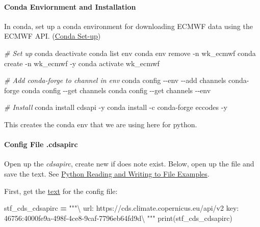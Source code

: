 \documentclass[
]{book}
\newenvironment{Shaded}{\begin{snugshade}}{\end{snugshade}}
\newcommand{\BuiltInTok}[1]{#1}
\newcommand{\CommentTok}[1]{\textcolor[rgb]{0.56,0.35,0.01}{\textit{#1}}}
\newcommand{\ExtensionTok}[1]{#1}
\newcommand{\NormalTok}[1]{#1}
\newcommand{\OperatorTok}[1]{\textcolor[rgb]{0.81,0.36,0.00}{\textbf{#1}}}
\newcommand{\StringTok}[1]{\textcolor[rgb]{0.31,0.60,0.02}{#1}}
\begin{document}
\hypertarget{conda-enviornment-and-installation}{%
\paragraph{Conda Enviornment and Installation}\label{conda-enviornment-and-installation}}

In conda, set up a conda environment for downloading ECMWF data using the ECMWF API. (\href{https://fanwangecon.github.io/Tex4Econ/nontex/install/windows/fn_installations.html}{Conda Set-up})

\begin{Shaded}
\begin{Highlighting}[]
\CommentTok{\# Set up}
\ExtensionTok{conda}\NormalTok{ deactivate}
\ExtensionTok{conda}\NormalTok{ list env}
\ExtensionTok{conda}\NormalTok{ env remove {-}n wk\_ecmwf}
\ExtensionTok{conda}\NormalTok{ create {-}n wk\_ecmwf {-}y}
\ExtensionTok{conda}\NormalTok{ activate wk\_ecmwf}

\CommentTok{\# Add conda{-}forge to channel in env}
\ExtensionTok{conda}\NormalTok{ config {-}{-}env {-}{-}add channels conda{-}forge}
\ExtensionTok{conda}\NormalTok{ config {-}{-}get channels}
\ExtensionTok{conda}\NormalTok{ config {-}{-}get channels {-}{-}env}

\CommentTok{\# Install}
\ExtensionTok{conda}\NormalTok{ install cdsapi {-}y}
\ExtensionTok{conda}\NormalTok{ install {-}c conda{-}forge eccodes {-}y}
\end{Highlighting}
\end{Shaded}

This creates the conda env that we are using here for python.

\hypertarget{config-file-.cdsapirc}{%
\paragraph{Config File .cdsapirc}\label{config-file-.cdsapirc}}

Open up the \emph{cdsapirc}, create new if does note exist. Below, open up the file and save the text. See \href{https://fanwangecon.github.io/pyfan/vig/support/inout/htmlpdfr/fp_files.html}{Python Reading and Writing to File Examples}.

First, get the \href{4000fe9a-498f-4ce8-9caf-7796eb64fd9d}{text} for the config file:

\begin{Shaded}
\begin{Highlighting}[]
\NormalTok{stf\_cds\_cdsapirc }\OperatorTok{=} \StringTok{"""\textbackslash{}}
\StringTok{url: https://cds.climate.copernicus.eu/api/v2}
\StringTok{key: 46756:4000fe9a{-}498f{-}4ce8{-}9caf{-}7796eb64fd9d\textbackslash{}}
\StringTok{"""}
\BuiltInTok{print}\NormalTok{(stf\_cds\_cdsapirc)}
\end{Highlighting}
\end{Shaded}
\end{document}

